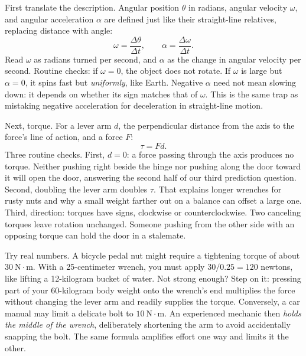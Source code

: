 \begin{mainline}
First translate the description. Angular position \(\theta\) in radians, angular velocity \(\omega\), and angular acceleration \(\alpha\) are defined just like their straight-line relatives, replacing distance with angle:
\[
  \omega=\frac{\Delta\theta}{\Delta t},\qquad
  \alpha=\frac{\Delta\omega}{\Delta t}.
\]
Read \(\omega\) as radians turned per second, and \(\alpha\) as the change in angular velocity per second. Routine checks: if \(\omega=0\), the object does not rotate. If \(\omega\) is large but \(\alpha=0\), it spins fast but \emph{uniformly}, like Earth. Negative \(\alpha\) need not mean slowing down: it depends on whether its sign matches that of \(\omega\). This is the same trap as mistaking negative acceleration for deceleration in straight-line motion.

Next, torque. For a lever arm \(d\), the perpendicular distance from the axis to the force's line of action, and a force \(F\):
\[
  \tau=Fd .
\]
Three routine checks. First, \(d=0\): a force passing through the axis produces no torque. Neither pushing right beside the hinge nor pushing along the door toward it will open the door, answering the second half of our third prediction question. Second, doubling the lever arm doubles \(\tau\). That explains longer wrenches for rusty nuts and why a small weight farther out on a balance can offset a large one. Third, direction: torques have signs, clockwise or counterclockwise. Two canceling torques leave rotation unchanged. Someone pushing from the other side with an opposing torque can hold the door in a stalemate.

Try real numbers. A bicycle pedal nut might require a tightening torque of about \(30\ \mathrm{N\cdot m}\). With a 25-centimeter wrench, you must apply \(30/0.25=120\) newtons, like lifting a 12-kilogram bucket of water. Not strong enough? Step on it: pressing part of your 60-kilogram body weight onto the wrench's end multiplies the force without changing the lever arm and readily supplies the torque. Conversely, a car manual may limit a delicate bolt to \(10\ \mathrm{N\cdot m}\). An experienced mechanic then \emph{holds the middle of the wrench}, deliberately shortening the arm to avoid accidentally snapping the bolt. The same formula amplifies effort one way and limits it the other.


\end{mainline}
